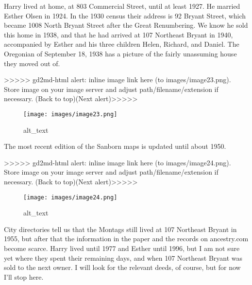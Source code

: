 \documentclass[
]{article}
\begin{document}
Harry lived at home, at 803 Commercial Street, until at least 1927. He
married Esther Olsen in 1924. In the 1930 census their address is 92
Bryant Street, which became 1008 North Bryant Street after the Great
Renumbering. We know he sold this home in 1938, and that he had arrived
at 107 Northeast Bryant in 1940, accompanied by Esther and his three
children Helen, Richard, and Daniel. The Oregonian of September 18, 1938
has a picture of the fairly unassuming house they moved out of.

{\textgreater\textgreater\textgreater\textgreater\textgreater{}
gd2md-html alert: inline image link here (to images/image23.png). Store
image on your image server and adjust path/filename/extension if
necessary. }(Back to top)(Next
alert){\textgreater\textgreater\textgreater\textgreater\textgreater{} }

\begin{figure}
\centering
\texttt{[image: images/image23.png]}
\caption{alt\_text}
\end{figure}

The most recent edition of the Sanborn maps is updated until about 1950.

{\textgreater\textgreater\textgreater\textgreater\textgreater{}
gd2md-html alert: inline image link here (to images/image24.png). Store
image on your image server and adjust path/filename/extension if
necessary. }(Back to top)(Next
alert){\textgreater\textgreater\textgreater\textgreater\textgreater{} }

\begin{figure}
\centering
\texttt{[image: images/image24.png]}
\caption{alt\_text}
\end{figure}

City directories tell us that the Montags still lived at 107 Northeast
Bryant in 1955, but after that the information in the paper and the
records on ancestry.com become scarce. Harry lived until 1977 and Esther
until 1996, but I am not sure yet where they spent their remaining days,
and when 107 Northeast Bryant was sold to the next owner. I will look
for the relevant deeds, of course, but for now I'll stop here.
\end{document}
